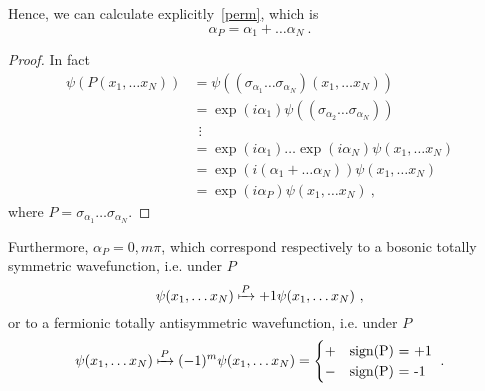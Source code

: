     Hence, we can calculate explicitly~\eqref{perm}, which is 
    \begin{equation}
        \alpha_P = \alpha_1 + \ldots \alpha_N~.
    \end{equation}
    \begin{proof}
        In fact
        \begin{equation*}
        \begin{aligned}
        \psi(P(x_1,\ldots x_N)) & = \psi((\sigma_{\alpha_1} \ldots \sigma_{\alpha_N}) (x_1,\ldots x_N)) \\ & = \exp (i \alpha_1) \psi((\sigma_{\alpha_2} \ldots \sigma_{\alpha_N}) ) \\ & ~~ \vdots \\ & = \exp (i \alpha_1) \ldots \exp (i \alpha_N) \psi(x_1,\ldots x_N) \\ & = \exp (i (\alpha_1 + \ldots \alpha_N)) \psi(x_1,\ldots x_N) \\ &  = \exp (i \alpha_P) \psi(x_1,\ldots x_N)~,
        \end{aligned}
        \end{equation*}
        where $P = \sigma_{\alpha_1} \ldots \sigma_{\alpha_N}$.
    \end{proof}

    Furthermore, $\alpha_P = 0, m\pi$, which correspond respectively to a bosonic totally symmetric wavefunction, i.e. under $P$
    \begin{equation*}
        \psi(x_1, \ldots x_N) \xmapsto{P} + 1 \psi(x_1, \ldots x_N) ~,
    \end{equation*}
    or to a fermionic totally antisymmetric wavefunction, i.e. under $P$ 
    \begin{equation*}
        \psi(x_1, \ldots x_N) \xmapsto{P} (-1)^m \psi(x_1, \ldots x_N) = \begin{cases}
            + & \textnormal{sign(P) = +1} \\
            - & \textnormal{sign(P) = -1} \\
        \end{cases}~.
    \end{equation*}

